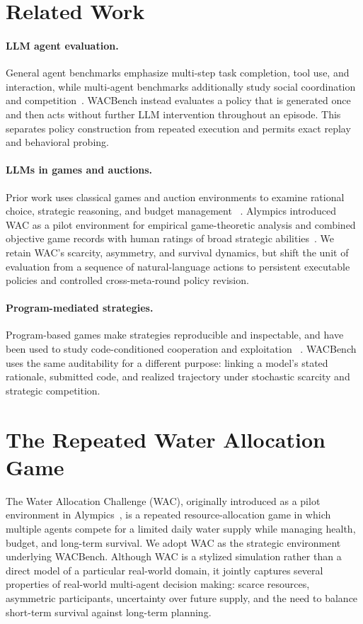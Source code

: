 \documentclass[letterpaper]{article} %
\begin{document}
\section{Related Work}

\paragraph{LLM agent evaluation.}
General agent benchmarks emphasize multi-step task completion, tool use,
and interaction, while multi-agent benchmarks additionally study social
coordination and competition~\cite{liu2023agentbench,mialon2023gaia,zhou2024sotopia,zhu2025multiagentbench}.
WACBench instead evaluates a policy that is generated once and then acts
without further LLM intervention throughout an episode. This separates
policy construction from repeated execution and permits exact replay and
behavioral probing.

\paragraph{LLMs in games and auctions.}
Prior work uses classical games and auction environments to examine
rational choice, strategic reasoning, and budget management
~\cite{fan2024rational,duan2024gtbench,huang2025gamabench,chen2023aucarena}.
Alympics introduced WAC as a pilot environment for empirical game-theoretic
analysis and combined objective game records with human ratings of broad
strategic abilities~\cite{mao2025alympics}. We retain WAC's scarcity,
asymmetry, and survival dynamics, but shift the unit of evaluation from a
sequence of natural-language actions to persistent executable policies and
controlled cross-meta-round policy revision.

\paragraph{Program-mediated strategies.}
Program-based games make strategies reproducible and inspectable, and have
been used to study code-conditioned cooperation and exploitation
~\cite{sistla2025opensourcegames}. WACBench uses the same auditability for a
different purpose: linking a model's stated rationale, submitted code, and
realized trajectory under stochastic scarcity and strategic competition.
\section{The Repeated Water Allocation Game}
The Water Allocation Challenge (WAC), originally introduced
as a pilot environment in Alympics~\cite{mao2025alympics},
is a repeated resource-allocation game in which multiple agents compete for a limited daily water supply while managing health, budget, and long-term survival. We adopt WAC as the strategic environment underlying WACBench. Although WAC is a stylized simulation rather than a direct model of a particular real-world domain, it jointly captures several properties of real-world multi-agent decision making: scarce resources, asymmetric participants, uncertainty over future supply, and the need to balance short-term survival against long-term planning.
\end{document}
